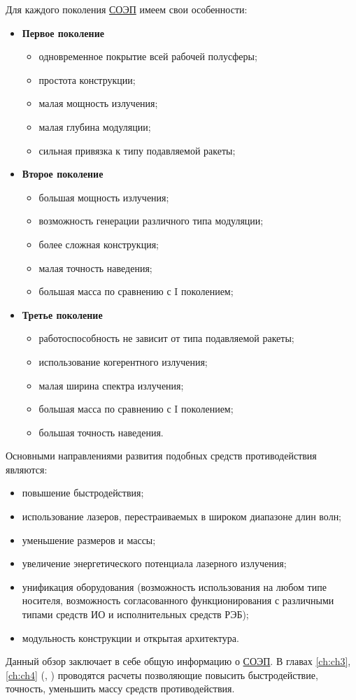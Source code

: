 Для каждого поколения  \hyperref[acroSOEP]{СОЭП} имеем свои особенности:
\begin{itemize}
	\item \textbf{Первое поколение}
	\begin{itemize}
		\item одновременное покрытие всей рабочей полусферы;
		\item простота конструкции;
		\item малая мощность излучения;
		\item малая глубина модуляции;
		\item сильная привязка к типу подавляемой ракеты;
	\end{itemize}
	\item \textbf{Второе поколение}
	\begin{itemize}
		\item большая мощность излучения;
		\item возможность генерации различного типа модуляции;
		\item более сложная конструкция;
		\item малая точность наведения;
		\item большая масса по сравнению с I поколением;
	\end{itemize}
	\item \textbf{Третье поколение}
	\begin{itemize}
		\item работоспособность не зависит от типа подавляемой ракеты;
		\item использование когерентного излучения;
		\item малая ширина спектра излучения;
		\item большая масса по сравнению с I поколением;
		\item большая точность наведения.
	\end{itemize}
\end{itemize}

Основными направлениями развития подобных средств противодействия являются:
\begin{itemize}
	\item повышение быстродействия;
	\item использование лазеров, перестраиваемых в широком диапазоне длин волн;
	\item уменьшение размеров и массы;
	\item увеличение энергетического потенциала лазерного излучения;
	\item унификация оборудования (возможность использования на любом типе носителя, возможность согласованного функционирования с различными типами средств ИО и исполнительных средств РЭБ);
	\item модульность конструкции и открытая архитектура.
\end{itemize}
Данный обзор заключает в себе общую информацию о  \hyperref[acroSOEP]{СОЭП}. В главах \ref{ch:ch3}, \ref{ch:ch4} (, ) проводятся расчеты позволяющие повысить быстродействие, точность, уменьшить массу средств противодействия.

